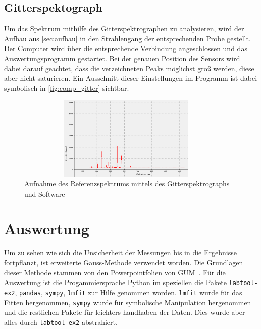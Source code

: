 \documentclass[12pt,english,ngerman]{scrartcl}
\begin{document}
\subsection{Gitterspektograph}

Um das Spektrum mithilfe des Gitterspektrographen zu analysieren, wird der
Aufbau aus \autoref{sec:aufbau} in den Strahlengang der entsprechenden Probe
gestellt. Der Computer wird über die entsprechende Verbindung angeschlossen und
das Auswertungsprogramm gestartet. Bei der genauen Position des Sensors wird
dabei darauf geachtet, dass die verzeichneten Peaks möglichst groß werden,
diese aber nicht saturieren. Ein Ausschnitt dieser Einstellungen im Programm
ist dabei symbolisch in \autoref{fig:comp_gitter} sichtbar.

\begin{figure}[H]
	\begin{center}
		\includegraphics[width=0.95\textwidth, height=4cm]{figures/gitterSpektComp.png}
	\end{center}
	\caption{Aufnahme des Referenzspektrums mittels des Gitterspektrographs und Software
	}\label{fig:comp_gitter}
\end{figure}

\section{Auswertung}\label{sec:auswertung}
Um zu sehen wie sich die Unsicherheit der Messungen bis in die Ergebnisse
fortpflanzt, ist erweiterte Gauss-Methode verwendet worden. Die Grundlagen
dieser Methode stammen von den Powerpointfolien von
GUM~\cite{wolfgang_kessel_isobipm-gum_2004}. Für die Auswertung ist die
Progammiersprache Python im speziellen die Pakete \verb#labtool-ex2#,
\verb#pandas#, \verb#sympy#, \verb#lmfit# zur Hilfe genommen worden.
\verb#lmfit# wurde für das Fitten hergenommen, \verb#sympy# wurde für
symbolische Manipulation hergenommen und die restlichen Pakete für leichters
handhaben der Daten. Dies wurde aber alles durch \verb#labtool-ex2#
abstrahiert.
\end{document}
